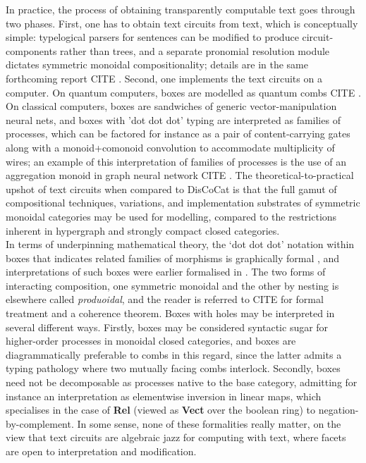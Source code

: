 In practice, the process of obtaining transparently computable text goes through two phases. First, one has to obtain text circuits from text, which is conceptually simple: typelogical parsers for sentences can be modified to produce circuit-components rather than trees, and a separate pronomial resolution module dictates symmetric monoidal compositionality; details are in the same forthcoming report \bR CITE \e. Second, one implements the text circuits on a computer. On quantum computers, boxes are modelled as quantum combs \bR CITE \e. On classical computers, boxes are sandwiches of generic vector-manipulation neural nets, and boxes with 'dot dot dot' typing are interpreted as families of processes, which can be factored for instance as a pair of content-carrying gates along with a monoid+comonoid convolution to accommodate multiplicity of wires; an example of this interpretation of families of processes is the use of an aggregation monoid in graph neural network \bR CITE \e. The theoretical-to-practical upshot of text circuits when compared to DisCoCat is that the full gamut of compositional techniques, variations, and implementation substrates of symmetric monoidal categories may be used for modelling, compared to the restrictions inherent in hypergraph and strongly compact closed categories.\\

In terms of underpinning mathematical theory, the `dot dot dot' notation within boxes that indicates related families of morphisms is graphically formal \citep{wilson_string_2022}, and interpretations of such boxes were earlier formalised in \citep{merry_reasoning_2014,quick_-logic_2015,zamdzhiev_rewriting_2017}. The two forms of interacting composition, one symmetric monoidal and the other by nesting is elsewhere called \emph{produoidal}, and the reader is referred to \bR CITE \e for formal treatment and a coherence theorem. Boxes with holes may be interpreted in several different ways. Firstly, boxes may be considered syntactic sugar for higher-order processes in monoidal closed categories, and boxes are diagrammatically preferable to combs in this regard, since the latter admits a typing pathology where two mutually facing combs interlock. Secondly, boxes need not be decomposable as processes native to the base category, admitting for instance an interpretation as elementwise inversion in linear maps, which specialises in the case of \textbf{Rel} (viewed as \textbf{Vect} over the boolean ring) to negation-by-complement. In some sense, none of these formalities really matter, on the view that text circuits are algebraic jazz for computing with text, where facets are open to interpretation and modification.\\

